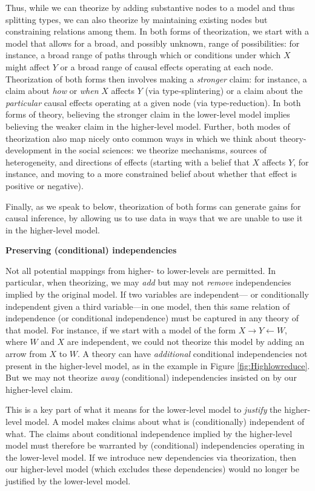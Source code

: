 \documentclass[
  12pt,
]{book}
\begin{document}
Thus, while we can theorize by adding substantive nodes to a model and thus splitting types, we can also theorize by maintaining existing nodes but constraining relations among them. In both forms of theorization, we start with a model that allows for a broad, and possibly unknown, range of possibilities: for instance, a broad range of paths through which or conditions under which \(X\) might affect \(Y\) or a broad range of causal effects operating at each node. Theorization of both forms then involves making a \emph{stronger} claim: for instance, a claim about \emph{how} or \emph{when} \(X\) affects \(Y\) (via type-splintering) or a claim about the \emph{particular} causal effects operating at a given node (via type-reduction). In both forms of theory, believing the stronger claim in the lower-level model implies believing the weaker claim in the higher-level model. Further, both modes of theorization also map nicely onto common ways in which we think about theory-development in the social sciences: we theorize mechanisms, sources of heterogeneity, and directions of effects (starting with a belief that \(X\) affects \(Y\), for instance, and moving to a more constrained belief about whether that effect is positive or negative).

Finally, as we speak to below, theorization of both forms can generate gains for causal inference, by allowing us to use data in ways that we are unable to use it in the higher-level model.

\textbf{Preserving (conditional) independencies}

Not all potential mappings from higher- to lower-levels are permitted. In particular, when theorizing, we may \emph{add} but may not \emph{remove} independencies implied by the original model. If two variables are independent--- or conditionally independent given a third variable---in one model, then this same relation of independence (or conditional independence) must be captured in any theory of that model. For instance, if we start with a model of the form \(X \rightarrow Y \leftarrow W\), where \(W\) and \(X\) are independent, we could not theorize this model by adding an arrow from \(X\) to \(W\). A theory can have \emph{additional} conditional independencies not present in the higher-level model, as in the example in Figure \ref{fig:Highlowreduce}. But we may not theorize \emph{away} (conditional) independencies insisted on by our higher-level claim.

This is a key part of what it means for the lower-level model to \emph{justify} the higher-level model. A model makes claims about what is (conditionally) independent of what. The claims about conditional independence implied by the higher-level model must therefore be warranted by (conditional) independencies operating in the lower-level model. If we introduce new dependencies via theorization, then our higher-level model (which excludes these dependencies) would no longer be justified by the lower-level model.
\end{document}
